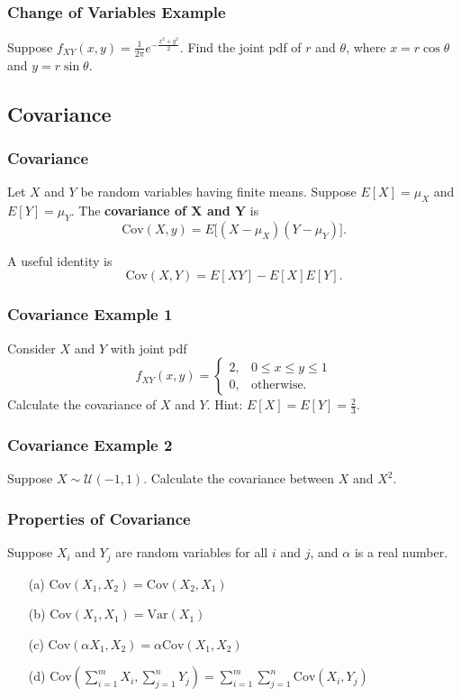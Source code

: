 \documentclass{beamer}
\begin{document}
\begin{frame}[t]
\frametitle{Change of Variables Example}
\begin{Example}
Suppose $f_{XY}(x, y) = \frac{1}{2\pi} e^{-\frac{x^2 + y^2}{2}}$. Find the joint pdf of $r$ and $\theta$, where $x = r\cos\theta$ and $y=r\sin\theta$.
\end{Example}
\end{frame}

\subsection{Covariance}
\begin{frame}
\frametitle{Covariance}
\begin{Definition}
Let $X$ and $Y$ be random variables having finite means. Suppose $E[X] = \mu_X$ and $E[Y] = \mu_Y$. The {\bf covariance of $\boldsymbol X$ and $\boldsymbol Y$} is
$$
\text{Cov}(X, y) = E\Big[(X - \mu_X)(Y - \mu_Y)\Big].
$$
\end{Definition}
A useful identity is
$$
\text{Cov}(X, Y) = E[XY] - E[X]E[Y].
$$
\end{frame}

\begin{frame}[t]
\frametitle{Covariance Example 1}
\tiny
\begin{Example}
Consider $X$ and $Y$ with joint pdf
$$
f_{XY}(x, y) = \begin{cases} 2, &	0\leq x \leq y\leq 1\\ 0,	&	\text{otherwise.}\end{cases}
$$
Calculate the covariance of $X$ and $Y$. Hint: $E[X] = E[Y] =  \frac{2}{3}.$
\end{Example}

\end{frame}

\begin{frame}[t]
\frametitle{Covariance Example 2}
\begin{Example}
Suppose $X\sim{\mathcal{U}(-1, 1)}$. Calculate the covariance between $X$ and $X^2$.
\end{Example}

\end{frame}


\begin{frame}
\frametitle{Properties of Covariance}
Suppose $X_i$ and $Y_j$ are random variables for all $i$ and $j$, and $\alpha$ is a real number.
\begin{enumerate}
\item[(a)] $\text{Cov}(X_1, X_2) = \text{Cov}(X_2, X_1)$
\item[(b)] $\text{Cov}(X_1, X_1) = \text{Var}(X_1)$
\item[(c)] $\text{Cov}(\alpha X_1, X_2) = \alpha \text{Cov}(X_1, X_2)$
\item[(d)] $\displaystyle \text{Cov}\left(\sum_{i = 1}^m X_i, \sum_{j = 1}^n Y_j\right) = \sum_{i = 1}^m\sum_{j = 1}^n \text{Cov}(X_i, Y_j)$
\end{enumerate}

\end{frame}
\end{document}
